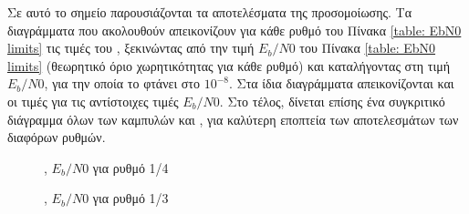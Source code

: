 Σε αυτό το σημείο παρουσιάζονται τα αποτελέσματα της προσομοίωσης. Τα διαγράμματα που ακολουθούν απεικονίζουν για κάθε ρυθμό του Πίνακα \ref{table: EbN0 limits} τις τιμές του , ξεκινώντας από την τιμή $E_b/N0$ του Πίνακα \ref{table: EbN0 limits} (θεωρητικό όριο χωρητικότητας για κάθε ρυθμό) και καταλήγοντας στη τιμή $E_b/N0$, για την οποία το  φτάνει στο $10^{-8}$. Στα ίδια διαγράμματα απεικονίζονται και οι τιμές  για τις αντίστοιχες τιμές $E_b/N0$. Στο τέλος, δίνεται επίσης ένα συγκριτικό διάγραμμα όλων των καμπυλών  και , για καλύτερη εποπτεία των αποτελεσμάτων των διαφόρων ρυθμών.
\begin{figure}[H]
\caption{, $E_b/N0$ για ρυθμό 1/4}
\end{figure}
\begin{figure}[H]
\caption{, $E_b/N0$ για ρυθμό 1/3}
\end{figure}
